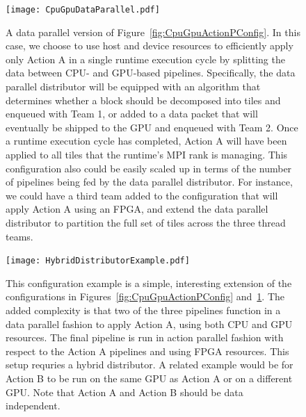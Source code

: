 \documentclass{article}
\begin{document}
\begin{appendices}
\begin{figure}[!hp]
\begin{center}
\texttt{[image: CpuGpuDataParallel.pdf]}
\caption[]{A data parallel version of Figure~\ref{fig:CpuGpuActionPConfig}.  In
this case, we choose to use host and device resources to efficiently apply only
Action A in a single runtime execution cycle by splitting the data between CPU-
and GPU-based pipelines.  Specifically, the data parallel distributor will be
equipped with an algorithm that determines whether a block should be decomposed
into tiles and enqueued with Team 1, or added to a data packet that will
eventually be shipped to the GPU and enqueued with Team 2.  Once a
runtime execution cycle has completed, Action A will have been applied to all
tiles that the runtime's MPI rank is managing.  This configuration also
could be easily scaled up in terms of the number of pipelines being fed by the
data parallel distributor.  For instance, we could have a third team added to
the configuration that will apply Action A using an FPGA, and extend the data
parallel distributor to partition the full set of tiles across the three thread
teams.}
\label{fig:CpuGpuDataPConfig}
\end{center}
\end{figure}

\begin{figure}[!hp]
\begin{center}
\texttt{[image: HybridDistributorExample.pdf]}
\caption[]{This configuration example is a simple, interesting extension of
the configurations in Figures~\ref{fig:CpuGpuActionPConfig}
and~\ref{fig:CpuGpuDataPConfig}.  The added complexity is that two of the three
pipelines function in a data parallel fashion to apply Action A, using both CPU
and GPU resources. The final pipeline is run in action parallel fashion
with respect to the Action A pipelines and using FPGA resources.   This setup
requries a hybrid distributor.  A related example would be for Action B to be
run on the same GPU as Action A or on a different GPU.  Note that Action A and
Action B should be data independent.}
\label{fig:HybridDistributorExample}
\end{center}
\end{figure}


\end{appendices}
\end{document}
